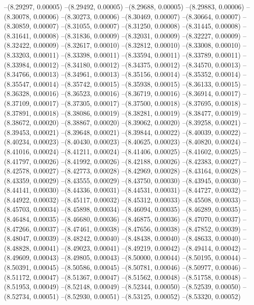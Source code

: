 --(8.29297, 0.00005)
--(8.29492, 0.00005)
--(8.29688, 0.00005)
--(8.29883, 0.00006)
--(8.30078, 0.00006)
--(8.30273, 0.00006)
--(8.30469, 0.00007)
--(8.30664, 0.00007)
--(8.30859, 0.00007)
--(8.31055, 0.00007)
--(8.31250, 0.00008)
--(8.31445, 0.00008)
--(8.31641, 0.00008)
--(8.31836, 0.00009)
--(8.32031, 0.00009)
--(8.32227, 0.00009)
--(8.32422, 0.00009)
--(8.32617, 0.00010)
--(8.32812, 0.00010)
--(8.33008, 0.00010)
--(8.33203, 0.00011)
--(8.33398, 0.00011)
--(8.33594, 0.00011)
--(8.33789, 0.00011)
--(8.33984, 0.00012)
--(8.34180, 0.00012)
--(8.34375, 0.00012)
--(8.34570, 0.00013)
--(8.34766, 0.00013)
--(8.34961, 0.00013)
--(8.35156, 0.00014)
--(8.35352, 0.00014)
--(8.35547, 0.00014)
--(8.35742, 0.00015)
--(8.35938, 0.00015)
--(8.36133, 0.00015)
--(8.36328, 0.00016)
--(8.36523, 0.00016)
--(8.36719, 0.00016)
--(8.36914, 0.00017)
--(8.37109, 0.00017)
--(8.37305, 0.00017)
--(8.37500, 0.00018)
--(8.37695, 0.00018)
--(8.37891, 0.00018)
--(8.38086, 0.00019)
--(8.38281, 0.00019)
--(8.38477, 0.00019)
--(8.38672, 0.00020)
--(8.38867, 0.00020)
--(8.39062, 0.00020)
--(8.39258, 0.00021)
--(8.39453, 0.00021)
--(8.39648, 0.00021)
--(8.39844, 0.00022)
--(8.40039, 0.00022)
--(8.40234, 0.00023)
--(8.40430, 0.00023)
--(8.40625, 0.00023)
--(8.40820, 0.00024)
--(8.41016, 0.00024)
--(8.41211, 0.00024)
--(8.41406, 0.00025)
--(8.41602, 0.00025)
--(8.41797, 0.00026)
--(8.41992, 0.00026)
--(8.42188, 0.00026)
--(8.42383, 0.00027)
--(8.42578, 0.00027)
--(8.42773, 0.00028)
--(8.42969, 0.00028)
--(8.43164, 0.00028)
--(8.43359, 0.00029)
--(8.43555, 0.00029)
--(8.43750, 0.00030)
--(8.43945, 0.00030)
--(8.44141, 0.00030)
--(8.44336, 0.00031)
--(8.44531, 0.00031)
--(8.44727, 0.00032)
--(8.44922, 0.00032)
--(8.45117, 0.00032)
--(8.45312, 0.00033)
--(8.45508, 0.00033)
--(8.45703, 0.00034)
--(8.45898, 0.00034)
--(8.46094, 0.00035)
--(8.46289, 0.00035)
--(8.46484, 0.00035)
--(8.46680, 0.00036)
--(8.46875, 0.00036)
--(8.47070, 0.00037)
--(8.47266, 0.00037)
--(8.47461, 0.00038)
--(8.47656, 0.00038)
--(8.47852, 0.00039)
--(8.48047, 0.00039)
--(8.48242, 0.00040)
--(8.48438, 0.00040)
--(8.48633, 0.00040)
--(8.48828, 0.00041)
--(8.49023, 0.00041)
--(8.49219, 0.00042)
--(8.49414, 0.00042)
--(8.49609, 0.00043)
--(8.49805, 0.00043)
--(8.50000, 0.00044)
--(8.50195, 0.00044)
--(8.50391, 0.00045)
--(8.50586, 0.00045)
--(8.50781, 0.00046)
--(8.50977, 0.00046)
--(8.51172, 0.00047)
--(8.51367, 0.00047)
--(8.51562, 0.00048)
--(8.51758, 0.00048)
--(8.51953, 0.00049)
--(8.52148, 0.00049)
--(8.52344, 0.00050)
--(8.52539, 0.00050)
--(8.52734, 0.00051)
--(8.52930, 0.00051)
--(8.53125, 0.00052)
--(8.53320, 0.00052)
